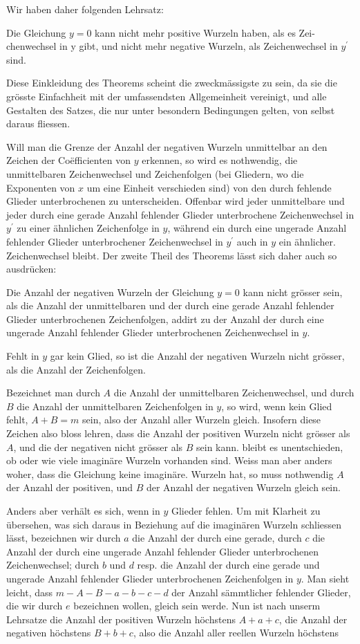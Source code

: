 \documentclass[10pt]{article}
\begin{document}
Wir haben daher folgenden Lehrsatz:

Die Gleichung \(y=0\) kann nicht mehr positive Wurzeln haben, als es Zei- chenwechsel in y gibt, und nicht mehr negative Wurzeln, als Zeichenwechsel in \(y^{\prime}\) sind.

Diese Einkleidung des Theorems scheint die zweckmässigste zu sein, da sie die grösste Einfachheit mit der umfassendsten Allgemeinheit vereinigt, und alle Gestalten des Satzes, die nur unter besondern Bedingungen gelten, von selbst daraus fliessen.

Will man die Grenze der Anzahl der negativen Wurzeln unmittelbar an den Zeichen der Coëfficienten von \(y\) erkennen, so wird es nothwendig, die unmittelbaren Zeichenwechsel und Zeichenfolgen (bei Gliedern, wo die Exponenten von \(x\) um eine Einheit verschieden sind) von den durch fehlende Glieder unterbrochenen zu unterscheiden. Offenbar wird jeder unmittelbare und jeder durch eine gerade Anzahl fehlender Glieder unterbrochene Zeichenwechsel in \(y^{\prime}\) zu einer ähnlichen Zeichenfolge in \(y\), während ein durch eine ungerade Anzahl fehlender Glieder unterbrochener Zeichenwechsel in \(y^{\prime}\) auch in \(y\) ein ähnlicher. Zeichenwechsel bleibt. Der zweite Theil des Theorems lässt sich daher auch so ausdrücken:

Die Anzahl der negativen Wurzeln der Gleichung \(y=0\) kann nicht grösser sein, als die Anzahl der unmittelbaren und der durch eine gerade Anzahl fehlender Glieder unterbrochenen Zeichenfolgen, addirt zu der Anzahl der durch eine ungerade Anzahl fehlender Glieder unterbrochenen Zeichenwechsel in \(y\).

Fehlt in \(y\) gar kein Glied, so ist die Anzahl der negativen Wurzeln nicht grösser, als die Anzahl der Zeichenfolgen.

Bezeichnet man durch \(A\) die Anzahl der unmittelbaren Zeichenwechsel, und durch \(B\) die Anzahl der unmittelbaren Zeichenfolgen in \(y\), so wird, wenn kein Glied fehlt, \(A+B=m\) sein, also der Anzahl aller Wurzeln gleich. Insofern diese Zeichen also bloss lehren, dass die Anzahl der positiven Wurzeln nicht grösser als \(A\), und die der negativen nicht grösser als \(B\) sein kann. bleibt es unentschieden, ob oder wie viele imaginäre Wurzeln vorhanden sind. Weiss man aber anders woher, dass die Gleichung keine imaginäre. Wurzeln hat, so muss nothwendig \(A\) der Anzahl der positiven, und \(B\) der Anzahl der negativen Wurzeln gleich sein.

Anders aber verhält es sich, wenn in \(y\) Glieder fehlen. Um mit Klarheit
zu übersehen, was sich daraus in Beziehung auf die imaginären Wurzeln schliessen lässt, bezeichnen wir durch \(a\) die Anzahl der durch eine gerade, durch \(c\) die Anzahl der durch eine ungerade Anzahl fehlender Glieder unterbrochenen Zeichenwechsel; durch \(b\) und \(d\) resp. die Anzahl der durch eine gerade und ungerade Anzahl fehlender Glieder unterbrochenen Zeichenfolgen in \(y\). Man sieht leicht, dass \(m-A-B-a-b-c-d\) der Anzahl sämmtlicher fehlender Glieder, die wir durch \(e\) bezeichnen wollen, gleich sein werde. Nun ist nach unserm Lehrsatze die Anzahl der positiven Wurzeln höchstens \(A+a+c\), die Anzahl der negativen höchstens \(B+b+c\), also die Anzahl aller reellen Wurzeln höchstens
\end{document}
